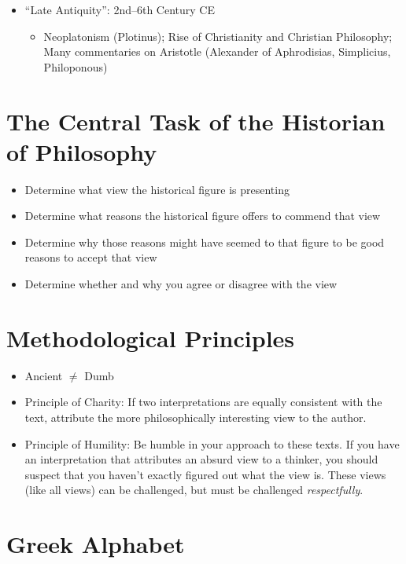 \documentclass[oneside]{article}
\begin{document}
\begin{itemize}
\begin{itemize}
\end{itemize}
\item{``Late Antiquity'': 2nd--6th Century CE}
\begin{itemize}
\item{Neoplatonism (Plotinus); Rise of Christianity and Christian Philosophy; Many commentaries on Aristotle (Alexander of Aphrodisias, Simplicius, Philoponous)}
\end{itemize}
\end{itemize}

\section*{The Central Task of the Historian of Philosophy}

\begin{itemize}
\item{Determine what view the historical figure is presenting}
\item{Determine what reasons the historical figure offers to commend that view}
\item{Determine why those reasons might have seemed to that figure to be good reasons to accept that view}
\item{Determine whether and why you agree or disagree with the view}
\end{itemize}

\section*{Methodological Principles}

\begin{itemize} 
\item{Ancient $\neq$ Dumb}
\item{Principle of Charity: If two interpretations are equally consistent with the text, attribute the more philosophically interesting view to the author.}
\item{Principle of Humility: Be humble in your approach to these texts. If you have an interpretation that attributes an absurd view to a thinker, you should suspect that you haven't exactly figured out what the view is. These views (like all views) can be challenged, but must be challenged \emph{respectfully}.}
\end{itemize}


\section*{Greek Alphabet}
\end{document}
